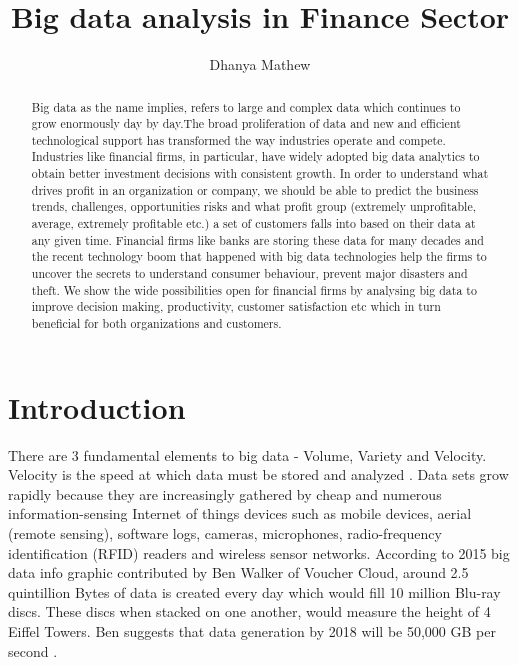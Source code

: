 \documentclass[sigconf]{acmart}
\begin{document}
\title{Big data analysis in Finance Sector}


\author{Dhanya Mathew}

\renewcommand{\shortauthors}{B. Trovato et al.}


\begin{abstract}

Big data as the name implies, refers to large and complex data which continues to grow enormously day by day.The broad proliferation of data and new and efficient technological support has transformed the way industries operate and compete. Industries like financial firms, in particular, have widely adopted big data analytics to obtain better investment decisions with consistent growth. In order to understand what drives profit in an organization or company, we should be able to predict the business trends, challenges, opportunities risks and what profit group (extremely unprofitable, average, extremely profitable etc.) a set of customers falls into based on their data at any given time. Financial firms like banks are storing these data for many decades and the recent technology boom that happened with big data technologies help the firms to uncover the secrets to understand consumer behaviour, prevent major disasters and theft. We show the wide possibilities open for financial firms by analysing big data to improve decision making, productivity, customer satisfaction etc which in turn beneficial for both organizations and customers.
\end{abstract}



\maketitle

\section{Introduction}

There are 3 fundamental elements to big data - Volume, Variety and Velocity. Velocity is the speed at which data must be stored and analyzed \cite{how-big-data-has-changed-finance}. Data sets grow rapidly because they are increasingly gathered by cheap and numerous information-sensing Internet of things devices such as mobile devices, aerial (remote sensing), software logs, cameras, microphones, radio-frequency identification (RFID) readers and wireless sensor networks\cite{/wiki/Big_data}. According to 2015 big data info graphic contributed by Ben Walker of Voucher Cloud, around 2.5 quintillion Bytes of data is created every day which would fill 10 million Blu-ray discs. These discs when stacked on one another, would measure the height of 4 Eiffel Towers. Ben suggests that data generation by 2018 will be 50,000 GB per second \cite{how-much-data-is-created-daily}. 
\end{document}
